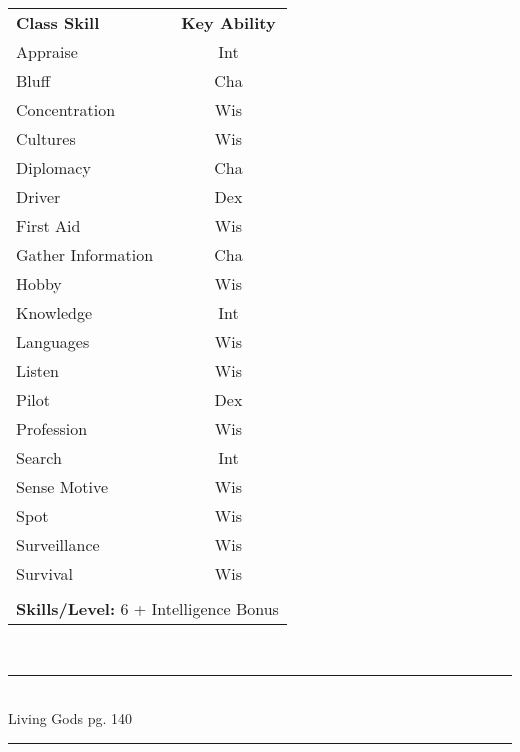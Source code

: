 \begin{table}[htb]
\raggedright
\begin{tabular}{l c}
\textbf{Class Skill} & \textbf{Key Ability}\\

Appraise & Int\\ 
Bluff & Cha\\ 
Concentration & Wis\\ 
Cultures & Wis\\ 
Diplomacy & Cha\\ 
Driver & Dex\\ 
First Aid & Wis\\ 
Gather Information & Cha\\ 
Hobby & Wis\\ 
Knowledge & Int\\ 
Languages & Wis\\ 
Listen & Wis\\ 
Pilot & Dex\\ 
Profession & Wis\\ 
Search & Int\\ 
Sense Motive & Wis\\ 
Spot & Wis\\ 
Surveillance & Wis\\ 
Survival & Wis\\ 


\multicolumn{2}{l}{\cellcolor{white}}\\
\multicolumn{2}{l}{\cellcolor{white}\textbf{Skills/Level:} 6 + Intelligence Bonus}\\
\end{tabular}
\end{table}

\setlength{\intextsep}{14.0pt plus 4.0pt minus 4.0pt}

\vspace*{4cm}

\vspace*{\fill}

\begin{center}
\textsc{\Large}\\[0.25cm]
\rule{\linewidth}{0.5mm}\\[0.6cm]
\fontsize{30}{30} \selectfont Living Gods pg. 140\\
\rule{\linewidth}{0.5mm}\\[0.6cm]
\vfill
\end{center}

\pagebreak



